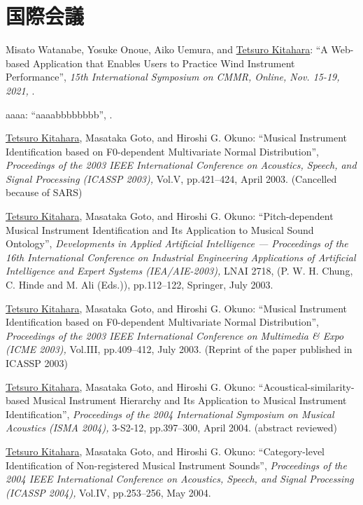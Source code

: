 \section*{国際会議}
\begin{Enumerate}
  
\item 
Misato Watanabe, 
Yosuke Onoue, 
Aiko Uemura, 
and 
\underline{Tetsuro Kitahara}: 
    ``A Web-based Application that Enables Users to Practice Wind Instrument Performance'', 
    {\it 15th International Symposium on CMMR, Online, Nov. 15-19, 2021,
    } . 

\item 
aaaa: 
    ``aaaabbbbbbbb'', 
    . 

\item 
\underline{Tetsuro Kitahara}, 
Masataka Goto, 
and 
Hiroshi
      G. Okuno: 
    ``Musical Instrument Identification based on F0-dependent Multivariate Normal Distribution'', 
    {\it Proceedings of
      the 2003 IEEE International Conference on Acoustics, Speech, and Signal Processing
          (ICASSP 2003),
        } Vol.V, pp.421--424, April 2003. 
(Cancelled because of SARS)
\item 
\underline{Tetsuro Kitahara}, 
Masataka Goto, 
and 
Hiroshi
      G. Okuno: 
    ``Pitch-dependent Musical Instrument Identification and Its Application to Musical Sound
      Ontology'', 
    {\it Developments in Applied Artificial Intelligence --- Proceedings of the 16th
      International Conference on Industrial Engineering Applications of Artificial Intelligence and
      Expert Systems (IEA/AIE-2003),
    } LNAI 2718, (P. W. H. Chung, C. Hinde and M. Ali (Eds.)), pp.112--122, Springer, July 2003. 

\item 
\underline{Tetsuro Kitahara}, 
Masataka Goto, 
and 
Hiroshi
      G. Okuno: 
    ``Musical Instrument Identification based on F0-dependent Multivariate Normal Distribution'', 
    {\it Proceedings of the 2003 IEEE International Conference
      on Multimedia \& Expo
          (ICME 2003),
        } Vol.III, pp.409--412, July 2003. 
(Reprint of the paper published in ICASSP 2003)
\item 
\underline{Tetsuro Kitahara}, 
Masataka Goto, 
and 
Hiroshi
      G. Okuno: 
    ``Acoustical-similarity-based Musical Instrument Hierarchy and Its Application to Musical
      Instrument Identification'', 
    {\it Proceedings of the 2004 International Symposium on
      Musical Acoustics
          (ISMA 2004),
        } 3-S2-12, pp.397--300, April 2004. 
(abstract reviewed)
\item 
\underline{Tetsuro Kitahara}, 
Masataka Goto, 
and 
Hiroshi
      G. Okuno: 
    ``Category-level Identification of Non-registered Musical Instrument Sounds'', 
    {\it Proceedings of
      the 2004 IEEE International Conference on Acoustics, Speech, and Signal Processing
          (ICASSP 2004),
        } Vol.IV, pp.253--256, May 2004. 


\end{Enumerate}
